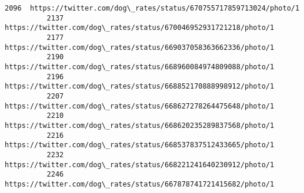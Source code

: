 \documentclass[11pt]{article}
\begin{document}
\begin{Verbatim}[commandchars=\\\{\}]
          2096  https://twitter.com/dog\_rates/status/670755717859713024/photo/1                                                                                                                                                                                                   
          2137  https://twitter.com/dog\_rates/status/670046952931721218/photo/1                                                                                                                                                                                                   
          2177  https://twitter.com/dog\_rates/status/669037058363662336/photo/1                                                                                                                                                                                                   
          2190  https://twitter.com/dog\_rates/status/668960084974809088/photo/1                                                                                                                                                                                                   
          2196  https://twitter.com/dog\_rates/status/668852170888998912/photo/1                                                                                                                                                                                                   
          2207  https://twitter.com/dog\_rates/status/668627278264475648/photo/1                                                                                                                                                                                                   
          2210  https://twitter.com/dog\_rates/status/668620235289837568/photo/1                                                                                                                                                                                                   
          2216  https://twitter.com/dog\_rates/status/668537837512433665/photo/1                                                                                                                                                                                                   
          2232  https://twitter.com/dog\_rates/status/668221241640230912/photo/1                                                                                                                                                                                                   
          2246  https://twitter.com/dog\_rates/status/667878741721415682/photo/1                                                                                                                                                                                                   

\end{Verbatim}
\end{document}
